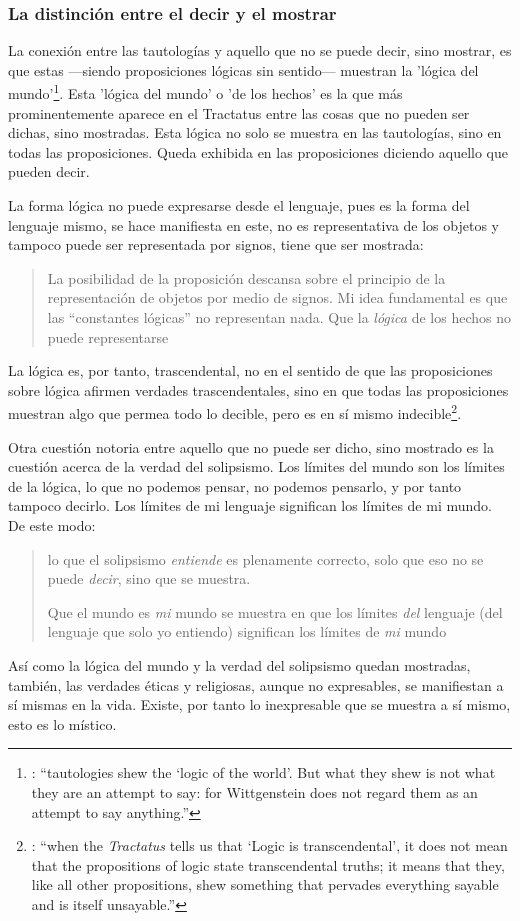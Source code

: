 \subsubsection{La distinción entre el decir y el mostrar}

La conexión entre las tautologías y aquello que no se puede decir, sino mostrar, es que estas ---siendo proposiciones lógicas sin sentido--- muestran la 'lógica del mundo'\footnote{\cite[Cf.~][163]{anscombe1959iwt}: \enquote{tautologies shew the `logic of the world'. But what they shew is not what they are an attempt to say: for Wittgenstein does not regard them as an attempt to say anything.}}. Esta 'lógica del mundo' o 'de los hechos' es la que más prominentemente aparece en el Tractatus entre las cosas que no pueden ser dichas, sino mostradas. Esta lógica no solo se muestra en las tautologías, sino en todas las proposiciones. Queda exhibida en las proposiciones diciendo aquello que pueden decir.

La forma lógica no puede expresarse desde el lenguaje, pues es la forma del lenguaje mismo, se hace manifiesta en este, no es representativa de los objetos y tampoco puede ser representada por signos, tiene que ser mostrada: \blockquote[{\cite[\S4.0312]{wittgenstein1922tractatuses}}]{La posibilidad de la proposición descansa sobre el principio de la representación de objetos por medio de signos. Mi idea fundamental es que las \enquote{constantes lógicas} no representan nada. Que la \emph{lógica} de los hechos no puede representarse}.

La lógica es, por tanto, trascendental, no en el sentido de que las proposiciones sobre lógica afirmen verdades trascendentales, sino en que todas las proposiciones muestran algo que permea todo lo decible, pero es en sí mismo indecible\footnote{\cite[Cf.~][166 \S2]{anscombe1959iwt}: \enquote{when the \emph{Tractatus} tells us that `Logic is transcendental', it does not mean that the propositions of logic state transcendental truths; it means that they, like all other propositions, shew something that pervades everything sayable and is itself unsayable.}}.

Otra cuestión notoria entre aquello que no puede ser dicho, sino mostrado es la cuestión acerca de la verdad del solipsismo. Los límites del mundo son los límites de la lógica, lo que no podemos pensar, no podemos pensarlo, y por tanto tampoco decirlo. Los límites de mi lenguaje significan los límites de mi mundo\autocite[Cf~.][\S5.6 y \S5.61]{wittgenstein1922tractatuses}. De este modo: \blockquote[{\cite[\S5.62]{wittgenstein1922tractatuses}}]{lo que el solipsismo \emph{entiende} es plenamente correcto, solo que eso no se puede \emph{decir}, sino que se muestra.

Que el mundo es \emph{mi} mundo se muestra en que los límites \emph{del} lenguaje (del lenguaje que solo yo entiendo) significan los límites de \emph{mi} mundo}. Así como la lógica del mundo y la verdad del solipsismo quedan mostradas, también, las verdades éticas y religiosas, aunque no expresables, se manifiestan a sí mismas en la vida. Existe, por tanto lo inexpresable que se muestra a sí mismo, esto es lo místico\autocite[Cf.~][\S6.522]{wittgenstein1922tractatuses}.

